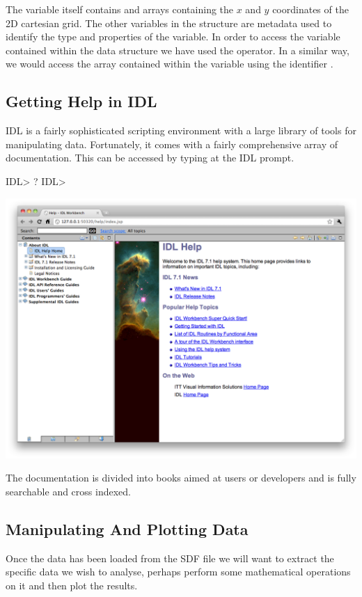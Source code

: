   The  variable itself contains  and  arrays
  containing the $x$ and $y$ coordinates of the 2D cartesian grid. The
  other variables in the  structure are metadata used to identify
  the type and properties of the variable.
  In order to access the  variable contained within the
   data structure we have used the  operator.
  In a similar way, we would access the  array contained within
  the  variable using the identifier .

\subsection{Getting Help in IDL}
  IDL is a fairly sophisticated scripting environment with a large
  library of tools for manipulating data. Fortunately, it comes with a
  fairly comprehensive array of documentation. This can be accessed by
  typing  at the IDL prompt.

\begin{boxverbatim}
IDL> ?
IDL>
\end{boxverbatim}
  \begin{center}
    \includegraphics[width=0.8\linewidth]{images/idl_help}
  \end{center}

  The documentation is divided into books aimed at users or developers and
  is fully searchable and cross indexed.

\subsection{Manipulating And Plotting Data}
  Once the data has been loaded from the SDF file we will want to extract
  the specific data we wish to analyse, perhaps perform some mathematical
  operations on it and then plot the results.


